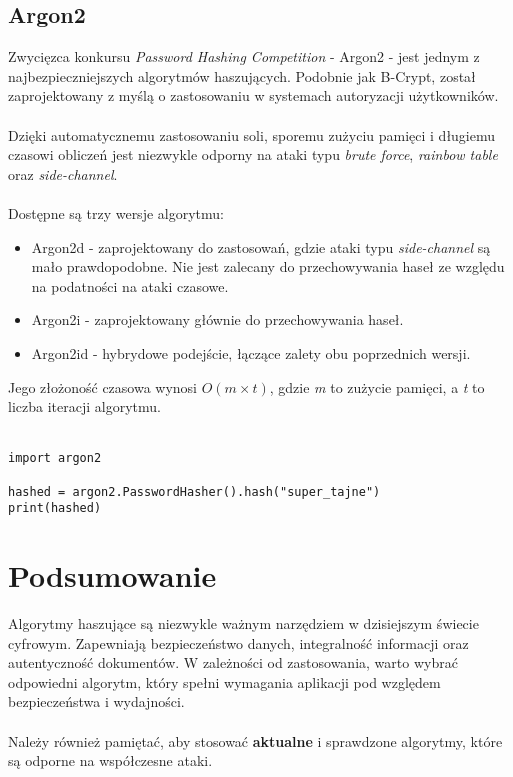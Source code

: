 \documentclass{article}
\begin{document}
    \clearpage

    \subsection{Argon2}
    \label{subsection:argon2}
    Zwycięzca konkursu \textit{Password Hashing Competition} - Argon2 - jest jednym z najbezpieczniejszych algorytmów haszujących.
    Podobnie jak B-Crypt, został zaprojektowany z myślą o zastosowaniu w systemach autoryzacji użytkowników.
    \\
    \\
    Dzięki automatycznemu zastosowaniu soli, sporemu zużyciu pamięci i długiemu czasowi obliczeń jest niezwykle odporny na ataki typu \textit{brute force}, \textit{rainbow table} oraz \textit{side-channel}.
    \\
    \\
    Dostępne są trzy wersje algorytmu:
    \begin{itemize}
        \item Argon2d - zaprojektowany do zastosowań, gdzie ataki typu \textit{side-channel} są mało prawdopodobne.
        Nie jest zalecany do przechowywania haseł ze względu na podatności na ataki czasowe.
        \item Argon2i - zaprojektowany głównie do przechowywania haseł.
        \item Argon2id - hybrydowe podejście, łączące zalety obu poprzednich wersji.
    \end{itemize}
    Jego złożoność czasowa wynosi $O(m \times t)$, gdzie \textit{m} to zużycie pamięci, a \textit{t} to liczba iteracji algorytmu.
    \\
    \\
    \begin{lstlisting}[title=Przykładowa implementacja w języku Python, label=lst:argon2-example]
import argon2

hashed = argon2.PasswordHasher().hash("super_tajne")
print(hashed)
    \end{lstlisting}

    \clearpage

    \section{Podsumowanie}
    \label{section:summary}
        Algorytmy haszujące są niezwykle ważnym narzędziem w dzisiejszym świecie cyfrowym.
        Zapewniają bezpieczeństwo danych, integralność informacji oraz autentyczność dokumentów.
        W zależności od zastosowania, warto wybrać odpowiedni algorytm, który spełni wymagania aplikacji pod względem bezpieczeństwa i wydajności.
        \\
        \\
        Należy również pamiętać, aby stosować \textbf{aktualne} i sprawdzone algorytmy, które są odporne na współczesne ataki.
\end{document}

